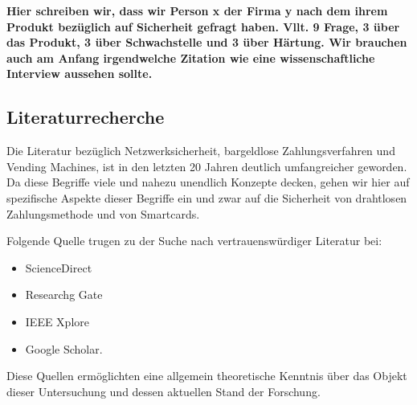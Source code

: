 \textbf{Hier schreiben wir, dass wir Person x der Firma y nach dem ihrem Produkt bezüglich auf Sicherheit gefragt haben.
Vllt. 9 Frage, 3 über das Produkt, 3 über Schwachstelle und 3 über Härtung. Wir brauchen auch am Anfang irgendwelche Zitation
wie eine wissenschaftliche Interview aussehen sollte.}

\subsection{Literaturrecherche}

Die Literatur bezüglich Netzwerksicherheit, bargeldlose Zahlungsverfahren und Vending Machines, ist in den 
letzten 20 Jahren deutlich umfangreicher geworden. Da diese Begriffe viele und nahezu unendlich Konzepte 
decken, gehen wir hier auf spezifische Aspekte dieser Begriffe ein und zwar auf die Sicherheit von drahtlosen 
Zahlungsmethode und von Smartcards. 

Folgende Quelle trugen zu der Suche nach vertrauenswürdiger Literatur bei:

\begin{itemize}
    \item ScienceDirect
    \item Researchg Gate
    \item IEEE Xplore
    \item Google Scholar.
\end{itemize}

Diese Quellen ermöglichten eine allgemein theoretische Kenntnis über das Objekt dieser Untersuchung und dessen aktuellen 
Stand der Forschung.